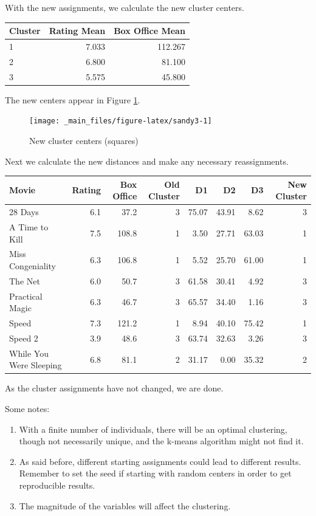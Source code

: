 \documentclass[
]{book}
\theoremstyle{definition}
\theoremstyle{definition}
\theoremstyle{definition}
\theoremstyle{definition}
\theoremstyle{remark}
\begin{document}
With the new assignments, we calculate the new cluster centers.

\begin{longtable}{lrr}
\toprule
Cluster & Rating Mean & Box Office Mean\\
\midrule
1 & 7.033 & 112.267\\
2 & 6.800 & 81.100\\
3 & 5.575 & 45.800\\
\bottomrule
\end{longtable}

The new centers appear in Figure \ref{fig:sandy3}.

\begin{figure}

{\centering \texttt{[image: \_main\_files/figure-latex/sandy3-1]} 

}

\caption{New cluster centers (squares)}\label{fig:sandy3}
\end{figure}

Next we calculate the new distances and make any necessary reassignments.

\begin{longtable}{lrrrrrrr}
\toprule
Movie & Rating & Box Office & Old Cluster & D1 & D2 & D3 & New Cluster\\
\midrule
28 Days & 6.1 & 37.2 & 3 & 75.07 & 43.91 & 8.62 & 3\\
A Time to Kill & 7.5 & 108.8 & 1 & 3.50 & 27.71 & 63.03 & 1\\
Miss Congeniality & 6.3 & 106.8 & 1 & 5.52 & 25.70 & 61.00 & 1\\
The Net & 6.0 & 50.7 & 3 & 61.58 & 30.41 & 4.92 & 3\\
Practical Magic & 6.3 & 46.7 & 3 & 65.57 & 34.40 & 1.16 & 3\\
Speed & 7.3 & 121.2 & 1 & 8.94 & 40.10 & 75.42 & 1\\
Speed 2 & 3.9 & 48.6 & 3 & 63.74 & 32.63 & 3.26 & 3\\
While You Were Sleeping & 6.8 & 81.1 & 2 & 31.17 & 0.00 & 35.32 & 2\\
\bottomrule
\end{longtable}

As the cluster assignments have not changed, we are done.

Some notes:

\begin{enumerate}
\def\labelenumi{\arabic{enumi}.}
\item
  With a finite number of individuals, there will be an optimal clustering, though not necessarily unique, and the k-means algorithm might not find it.
\item
  As said before, different starting assignments could lead to different results. Remember to set the seed if starting with random centers in order to get reproducible results.
\item
  The magnitude of the variables will affect the clustering.
\end{enumerate}
\end{document}
